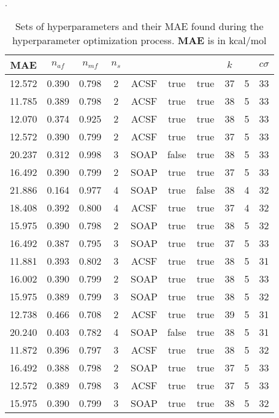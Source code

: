 \documentclass[12pt]{article}
\begin{document}
\begin{table}[H]
	\centering
	\caption{Sets of hyperparameters and their MAE found during the hyperparameter optimization process. \textbf{MAE} is in kcal/mol}.
	\begin{tabular}{|c|c|c|c|c|c|c|c|c|c|}
		\hline
		\textbf{MAE}	& $n_{af}$ & $n_{mf}$ & $n_s$ & \codeword{ftype} & \codeword{norm_af} & \codeword{norm_mf} & $k$ & \codeword{model} & $c\sigma$	\\ \hline
		12.572	& 0.390	& 0.798	& 2	& ACSF	& true	& true	& 37	& 5	& 33	\\ \hline
		11.785	& 0.389	& 0.798	& 2	& ACSF	& true	& true	& 38	& 5	& 33	\\ \hline
		12.070	& 0.374	& 0.925	& 2	& ACSF	& true	& true	& 38	& 5	& 33	\\ \hline
		12.572	& 0.390	& 0.799	& 2	& ACSF	& true	& true	& 37	& 5	& 33	\\ \hline
		20.237	& 0.312	& 0.998	& 3	& SOAP	& false	& true	& 38	& 5	& 33	\\ \hline
		16.492	& 0.390	& 0.799	& 2	& SOAP	& true	& true	& 37	& 5	& 33	\\ \hline
		21.886	& 0.164	& 0.977	& 4	& SOAP	& true	& false	& 38	& 4	& 32	\\ \hline
		18.408	& 0.392	& 0.800	& 4	& ACSF	& true	& true	& 37	& 4	& 32	\\ \hline
		15.975	& 0.390	& 0.798	& 2	& SOAP	& true	& true	& 38	& 5	& 32	\\ \hline
		16.492	& 0.387	& 0.795	& 3	& SOAP	& true	& true	& 37	& 5	& 33	\\ \hline
		11.881	& 0.393	& 0.802	& 3	& ACSF	& true	& true	& 38	& 5	& 31	\\ \hline
		16.002	& 0.390	& 0.799	& 2	& SOAP	& true	& true	& 38	& 5	& 33	\\ \hline
		15.975	& 0.389	& 0.799	& 3	& SOAP	& true	& true	& 38	& 5	& 32	\\ \hline
		12.738	& 0.466	& 0.708	& 2	& ACSF	& true	& true	& 39	& 5	& 31	\\ \hline
		20.240	& 0.403	& 0.782	& 4	& SOAP	& false	& true	& 38	& 5	& 31	\\ \hline
		11.872	& 0.396	& 0.797	& 3	& ACSF	& true	& true	& 38	& 5	& 32	\\ \hline
		16.492	& 0.388	& 0.798	& 2	& SOAP	& true	& true	& 37	& 5	& 33	\\ \hline
		12.572	& 0.389	& 0.798	& 3	& ACSF	& true	& true	& 37	& 5	& 33	\\ \hline
		15.975	& 0.390	& 0.799	& 3	& SOAP	& true	& true	& 38	& 5	& 32	\\ \hline

\end{tabular}
\end{table}
\end{document}
